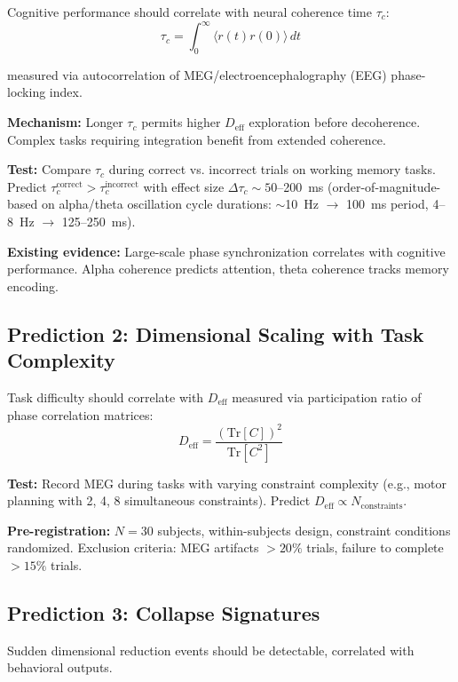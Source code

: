 \documentclass[12pt]{article}
\begin{document}
Cognitive performance should correlate with neural coherence time $\tau_c$:
\begin{equation}
\tau_c = \int_0^\infty \langle r(t) r(0) \rangle \, dt
\end{equation}

measured via autocorrelation of MEG/electroencephalography (EEG) phase-locking index.

\textbf{Mechanism:} Longer $\tau_c$ permits higher $D_{\text{eff}}$ exploration before decoherence. Complex tasks requiring integration benefit from extended coherence.

\textbf{Test:} Compare $\tau_c$ during correct vs. incorrect trials on working memory tasks. Predict $\tau_c^{\text{correct}} > \tau_c^{\text{incorrect}}$ with effect size $\Delta \tau_c \sim 50$--200~ms (order-of-magnitude-based on alpha/theta oscillation cycle durations: $\sim$10~Hz $\to$ 100~ms period, 4--8~Hz $\to$ 125--250~ms).

\textbf{Existing evidence:} Large-scale phase synchronization correlates with cognitive performance. Alpha coherence predicts attention, theta coherence tracks memory encoding.

\subsection{Prediction 2: Dimensional Scaling with Task Complexity}

Task difficulty should correlate with $D_{\text{eff}}$ measured via participation ratio of phase correlation matrices:
\begin{equation}
D_{\text{eff}} = \frac{(\text{Tr}[C])^2}{\text{Tr}[C^2]}
\end{equation}

\textbf{Test:} Record MEG during tasks with varying constraint complexity (e.g., motor planning with 2, 4, 8 simultaneous constraints). Predict $D_{\text{eff}} \propto N_{\text{constraints}}$.

\textbf{Pre-registration:} $N = 30$ subjects, within-subjects design, constraint conditions randomized. Exclusion criteria: MEG artifacts $>20\%$ trials, failure to complete $>15\%$ trials.

\subsection{Prediction 3: Collapse Signatures}

Sudden dimensional reduction events should be detectable, correlated with behavioral outputs.
\end{document}
